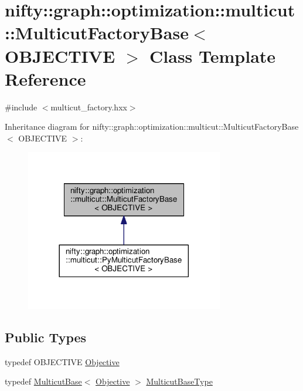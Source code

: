 \hypertarget{classnifty_1_1graph_1_1optimization_1_1multicut_1_1MulticutFactoryBase}{}\section{nifty\+:\+:graph\+:\+:optimization\+:\+:multicut\+:\+:Multicut\+Factory\+Base$<$ O\+B\+J\+E\+C\+T\+I\+V\+E $>$ Class Template Reference}
\label{classnifty_1_1graph_1_1optimization_1_1multicut_1_1MulticutFactoryBase}


{\ttfamily \#include $<$multicut\+\_\+factory.\+hxx$>$}



Inheritance diagram for nifty\+:\+:graph\+:\+:optimization\+:\+:multicut\+:\+:Multicut\+Factory\+Base$<$ O\+B\+J\+E\+C\+T\+I\+V\+E $>$\+:\nopagebreak
\begin{figure}[H]
\begin{center}
\leavevmode
\includegraphics[width=245pt]{classnifty_1_1graph_1_1optimization_1_1multicut_1_1MulticutFactoryBase__inherit__graph}
\end{center}
\end{figure}
\subsection*{Public Types}
\begin{DoxyCompactItemize}
\item 
typedef O\+B\+J\+E\+C\+T\+I\+V\+E \hyperlink{classnifty_1_1graph_1_1optimization_1_1multicut_1_1MulticutFactoryBase_a598ed08cf4e7b1c9ab0573213eb4e88d}{Objective}
\item 
typedef \hyperlink{classnifty_1_1graph_1_1optimization_1_1multicut_1_1MulticutBase}{Multicut\+Base}$<$ \hyperlink{classnifty_1_1graph_1_1optimization_1_1multicut_1_1MulticutFactoryBase_a598ed08cf4e7b1c9ab0573213eb4e88d}{Objective} $>$ \hyperlink{classnifty_1_1graph_1_1optimization_1_1multicut_1_1MulticutFactoryBase_a2d8fbd85c1542fef172da90ef55af326}{Multicut\+Base\+Type}
\end{DoxyCompactItemize}
